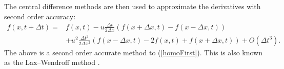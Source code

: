 %
The central difference methods are then used to approximate the derivatives with second order accuracy:
%
\begin{align*}
f(x,t+\Delta t) =& f(x,t) - u \frac{\Delta t}{2 \Delta x} (f(x+\Delta x,t) - f(x-\Delta x,t))\\
&+ u^2 \frac{\Delta t^2}{2 \Delta x^2} (f(x-\Delta x,t) - 2 f(x,t) + f(x+\Delta x,t)) + O(\Delta t^3).
\end{align*}
%
The above is a second order accurate method to (\ref{homoFirst}). This is also known as the Lax–Wendroff method \cite{lax}.
